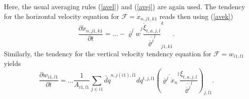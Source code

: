 Here, the usual averaging rules (\ref{avel}) and (\ref{avej}) are again used. The tendency
for the horizontal velocity equation for $\mathcal{F}=\dot{x}_{n,j1,k1}$ reads then using (\ref{avek})
\begin{displaymath}
 \frac{\partial\dot{x}_{n,j1,k1}}{\partial t}=
...-\overline{\overline{\overline{\varrho}^lw}^j
\frac{\xi_{t,a,j,l}}{\overline{\overline{\varrho}^j}^l}}^k_{j1,k1}.
\end{displaymath}
Similarly, the tendency for the vertical velocity tendency equation for $\mathcal{F}=w_{i1,l1}$ yields
\begin{displaymath}
 \frac{\partial w_{i1,l1}}{\partial t}=...
\frac{1}{A_{i1,l1}}\sum_{j\in i1}\widetilde{dq}^{n,j(i1),l1}dq^{t,j,l1}
\left(\overline{\overline{\varrho}^j\dot{x}_{n}}^l\frac{\xi_{t,a,j,l}}{\overline{\overline{\varrho}^j}^l}\right)_{j,l1}.
\end{displaymath}


